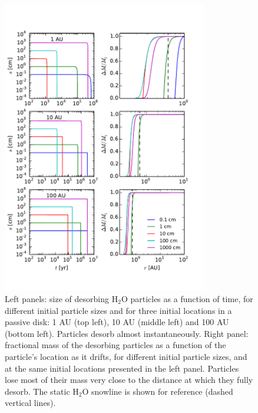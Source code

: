\documentclass[apj]{emulateapj}
\begin{document}
\begin{figure}[t!]
\centering
\includegraphics[width=0.8\textwidth]{s_t_a.pdf}
\caption{Left panels: size of desorbing H$_2$O particles as a function of time, for different initial particle sizes and for three initial locations in a passive disk: 1 AU (top left), 10 AU (middle left) and 100 AU (bottom left). Particles desorb almost instantaneously. Right panel: fractional mass of the desorbing particles as a function of the particle's location as it drifts, for different initial particle sizes, and at the same initial locations presented in the left panel. Particles lose most of their mass very close to the distance at which they fully desorb. The static H$_2$O snowline is shown for reference (dashed vertical lines).}
\label{fig:s_t_a}
\end{figure}
\end{document}
